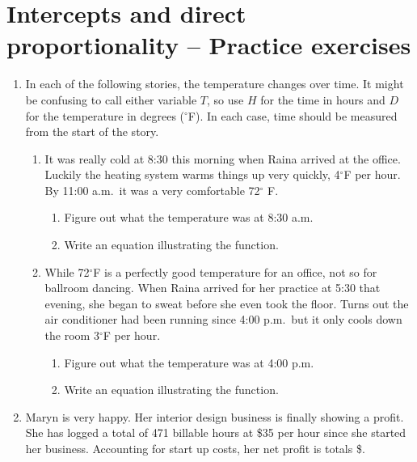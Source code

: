 
\section{Intercepts and direct proportionality -- Practice exercises}

\begin{enumerate}

\item In each of the following stories, the temperature changes over time.  It might be confusing to call either variable $T$, so use $H$ for the time in hours and $D$ for the temperature in degrees ($^{\circ}$F).  In each case, time should be measured from the start of the story.
\begin{enumerate}
\item It was really cold at 8:30 this morning when Raina arrived at the office.  Luckily the heating system warms things up very quickly, 4$^\circ$F per hour.  By 11:00 a.m.\  it was a very comfortable 72$^\circ$ F.
\begin{enumerate}
\item Figure out what the temperature was at 8:30 a.m.  \vfill
\item Write an equation illustrating the function.   \vfill
\end{enumerate}
\item While 72$^\circ$F is a perfectly good temperature for an office, not so for ballroom dancing. When Raina arrived for her practice at 5:30 that evening, she began to sweat before she even took the floor.  Turns out the air conditioner had been running since 4:00 p.m.\ but it only cools down the room 3$^\circ$F per hour.
\begin{enumerate}
\item Figure out what the temperature was at 4:00 p.m.   \vfill
\item Write an equation illustrating the function.   \vfill
\end{enumerate} 
\end{enumerate}

\newpage %

\item Maryn is very happy.  Her interior design business is finally showing a profit.  She has logged a total of 471 billable hours at \$35 per hour since she started her business.  Accounting for start up costs, her net profit is totals  \$.


\end{enumerate}
